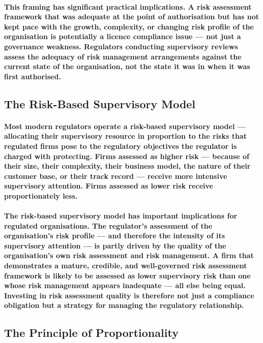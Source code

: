 \paragraph{This framing has significant practical implications. A risk assessment framework that was adequate at the point of authorisation but has not kept pace with the growth, complexity, or changing risk profile of the organisation is potentially a licence compliance issue — not just a governance weakness. Regulators conducting supervisory reviews assess the adequacy of risk management arrangements against the current state of the organisation, not the state it was in when it was first authorised.}

\subsection{The Risk-Based Supervisory Model}
\paragraph{Most modern regulators operate a \textbf{risk-based supervisory model} — allocating their supervisory resource in proportion to the risks that regulated firms pose to the regulatory objectives the regulator is charged with protecting. Firms assessed as higher risk — because of their size, their complexity, their business model, the nature of their customer base, or their track record — receive more intensive supervisory attention. Firms assessed as lower risk receive proportionately less.}
\paragraph{The risk-based supervisory model has important implications for regulated organisations. The regulator's assessment of the organisation's risk profile — and therefore the intensity of its supervisory attention — is partly driven by the quality of the organisation's own risk assessment and risk management. A firm that demonstrates a mature, credible, and well-governed risk assessment framework is likely to be assessed as lower supervisory risk than one whose risk management appears inadequate — all else being equal. Investing in risk assessment quality is therefore not just a compliance obligation but a strategy for managing the regulatory relationship.}

\subsection{The Principle of Proportionality}
